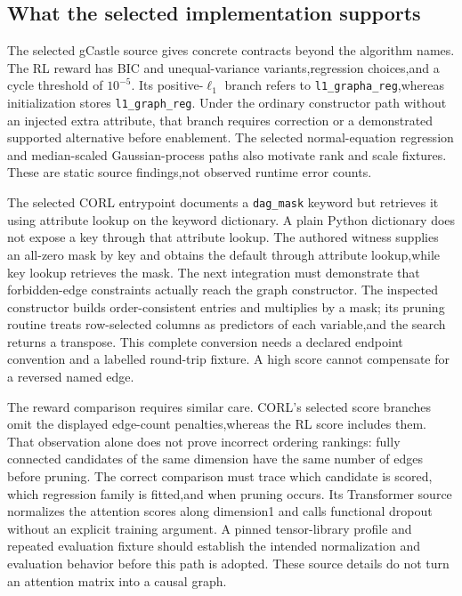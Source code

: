 \subsection{What the selected implementation supports}
The selected gCastle source gives concrete contracts beyond the algorithm names. The RL reward
has BIC and unequal-variance variants,regression choices,and a cycle threshold of $10^{-5}$.
Its positive-$\ell_1$ branch refers to \texttt{l1\_grapha\_reg},whereas initialization stores
\texttt{l1\_graph\_reg}. Under the ordinary constructor path without an injected extra attribute,
that branch requires correction or a demonstrated supported alternative before enablement.
The selected normal-equation regression and median-scaled Gaussian-process paths also motivate
rank and scale fixtures. These are static source findings,not observed runtime error counts.
\citep{exec28_rl_gcastle}

The selected CORL entrypoint documents a \texttt{dag\_mask} keyword but retrieves it using
attribute lookup on the keyword dictionary. A plain Python dictionary does not expose a key
through that attribute lookup. The authored witness supplies an all-zero mask by key and obtains
the default through attribute lookup,while key lookup retrieves the mask. The next integration
must demonstrate that forbidden-edge constraints actually reach the graph constructor.
The inspected constructor builds order-consistent entries and multiplies by a mask; its pruning
routine treats row-selected columns as predictors of each variable,and the search returns a
transpose. This complete conversion needs a declared endpoint convention and a labelled
round-trip fixture. A high score cannot compensate for a reversed named edge.
\citep{exec28_rl_gcastle,exec28_rl_reference}

The reward comparison requires similar care. CORL's selected score branches omit the displayed
edge-count penalties,whereas the RL score includes them. That observation alone does not prove
incorrect ordering rankings: fully connected candidates of the same dimension have the same
number of edges before pruning. The correct comparison must trace which candidate is scored,
which regression family is fitted,and when pruning occurs. Its Transformer source normalizes
the attention scores along dimension1 and calls functional dropout without an explicit training
argument. A pinned tensor-library profile and repeated evaluation fixture should establish the
intended normalization and evaluation behavior before this path is adopted. These source details
do not turn an attention matrix into a causal graph.\citep{exec28_rl_gcastle}

